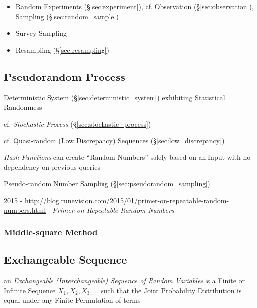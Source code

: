 \begin{itemize}
  \item Random Experiments (\S\ref{sec:experiment}), cf. Observation
    (\S\ref{sec:observation}), Sampling (\S\ref{sec:random_sample})
  \item Survey Sampling
  \item Resampling (\S\ref{sec:resampling})
\end{itemize}



\subsection{Pseudorandom Process}\label{sec:pseudorandom_process}

Deterministic System (\S\ref{sec:deterministic_system}) exhibiting Statistical
Randomness

cf. \emph{Stochastic Process} (\S\ref{sec:stochastic_process})

cf. Quasi-random (Low Discrepancy) Sequences (\S\ref{sec:low_discrepancy})

\emph{Hash Functions} can create ``Random Numbers'' solely based on an Input
with no dependency on previous queries

\fist Pseudo-random Number Sampling (\S\ref{sec:pseudorandom_sampling})

2015 -
\url{http://blog.runevision.com/2015/01/primer-on-repeatable-random-numbers.html}
- \emph{Primer on Repeatable Random Numbers}



\subsubsection{Middle-square Method}\label{sec:middle_square_method}



\subsection{Exchangeable Sequence}\label{sec:exchangeable_sequence}

an \emph{Exchangeable (Interchangeable) Sequence of Random Variables} is a
Finite or Infinite Sequence $X_1, X_2, X_3, \ldots$ such that the Joint
Probability Distribution is equal under any Finite Permutation of terms

